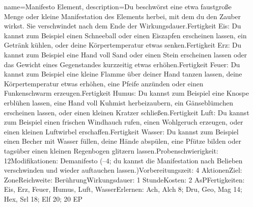 {
    name={Manifesto Element},
    description={Du beschwörst eine etwa faustgroße Menge oder kleine Manifestation des Elements herbei, mit dem du den Zauber wirkst. Sie verschwindet nach dem Ende der Wirkungsdauer.\newline Fertigkeit Eis: Du kannst zum Beispiel einen Schneeball oder einen Eiszapfen erscheinen lassen, ein Getränk kühlen, oder deine Körpertemperatur etwas senken.\newline Fertigkeit Erz: Du kannst zum Beispiel eine Hand voll Sand oder einen Stein erscheinen lassen oder das Gewicht eines Gegenstandes kurzzeitig etwas erhöhen.\newline Fertigkeit Feuer: Du kannst zum Beispiel eine kleine Flamme über deiner Hand tanzen lassen, deine Körpertemperatur etwas erhöhen, eine Pfeife anzünden  oder einen Funkenschwarm erzeugen.\newline Fertigkeit Humus: Du kannst zum Beispiel eine Knospe erblühen lassen, eine Hand voll Kuhmist herbeizaubern, ein Gänseblümchen erscheinen lassen, oder einen kleinen Kratzer schließen.\newline Fertigkeit Luft: Du kannst zum Beispiel einen frischen Windhauch rufen, einen Wohlgeruch erzeugen, oder einen kleinen Luftwirbel erschaffen.\newline Fertigkeit Wasser: Du kannst zum Beispiel einen Becher mit Wasser füllen, deine Hände abspülen, eine Pfütze bilden oder tagsüber einen kleinen Regenbogen glitzern lassen.\newline Probenschwierigkeit: 12\newline Modifikationen: Demanifesto (–4; du kannst die Manifestation nach Belieben verschwinden und wieder auftauchen lassen.)\newline Vorbereitungszeit: 4 Aktionen\newline Ziel: Zone\newline Reichweite: Berührung\newline Wirkungsdauer: 1 Stunde\newline Kosten: 2 AsP\newline Fertigkeiten: Eis, Erz, Feuer, Humus, Luft, Wasser\newline Erlernen: Ach, Alch 8; Dru, Geo, Mag 14; Hex, Srl 18; Elf 20; 20 EP}
}


